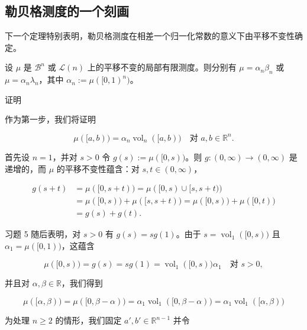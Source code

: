 \subsection*{勒贝格测度的一个刻画}

下一个定理特别表明，勒贝格测度在相差一个归一化常数的意义下由平移不变性确定。

\begin{theorem}

设 $ \mu $ 是 $ \mathcal{B}^n $ 或 $ \mathcal{L}(n) $ 上的平移不变的局部有限测度。则分别有 $ \mu = \alpha_n \beta_n $ 或 $ \mu = \alpha_n \lambda_n $，其中 $ \alpha_n := \mu([0, 1)^n) $。

证明

\begin{subitems}
\item

作为第一步，我们将证明

\[
\mu([a, b)) = \alpha_n \operatorname{vol}_n([a, b)) \quad \text{对 } a, b \in \mathbb{R}^n .
\]

首先设 $ n = 1 $，并对 $ s > 0 $ 令 $ g(s) := \mu([0, s)) $。则 $ g: (0, \infty) \to (0, \infty) $ 是递增的，而 $ \mu $ 的平移不变性蕴含：对 $ s, t \in (0, \infty) $，

\begin{equation*}
\begin{aligned}
g(s + t) &= \mu([0, s + t)) = \mu([0, s) \cup [s, s + t)) \\ &= \mu([0, s)) + \mu([s, s + t)) = \mu([0, s)) + \mu([0, t)) \\ &= g(s) + g(t) .
\end{aligned}
\end{equation*}

习题 5 随后表明，对 $ s > 0 $ 有 $ g(s) = s g(1) $。由于 $ s = \operatorname{vol}_1([0, s)) $ 且 $ \alpha_1 = \mu([0, 1)) $，这蕴含

\[
\mu([0, s)) = g(s) = s g(1) = \operatorname{vol}_1([0, s)) \alpha_1 \quad \text{对 } s > 0 ,
\]

并且对 $ \alpha, \beta \in \mathbb{R} $，我们得到

\begin{equation}
\mu([\alpha, \beta)) = \mu([0, \beta - \alpha)) = \alpha_1 \operatorname{vol}_1([0, \beta - \alpha)) = \alpha_1 \operatorname{vol}_1([\alpha, \beta))\tag{5.12}
\end{equation}

为处理 $ n \ge 2 $ 的情形，我们固定 $ a', b' \in \mathbb{R}^{n-1} $ 并令


\end{subitems}
\end{theorem}
